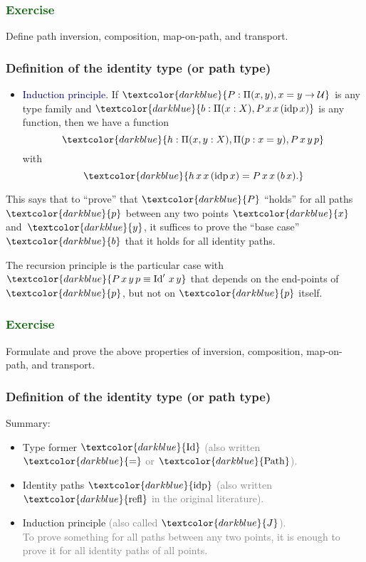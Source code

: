 \documentclass[aspectratio=169]{beamer}
\newcommand{\eqq}{\equiv}
\newcommand{\U}{\operatorname{\mathcal{U}}}
\newcommand{\db}{\textcolor{darkblue}}
\newcommand{\dg}{\textcolor{darkgreen}}
\newcommand{\grey}{\textcolor{grey}}
\newcommand{\m}[1]{$\db{#1}$}
\newcommand{\M}[1]{\[\db{#1}\]}
\newcommand{\refl}{\operatorname{refl}}
\newcommand{\idp}{\operatorname{idp}}
\newcommand{\Id}{\operatorname{Id}}
\newcommand{\Path}{\operatorname{Path}}
\begin{document}
\begin{frame} \frametitle{\dg{Exercise}}

  Define path inversion, composition, map-on-path, and transport.

\end{frame}

 
 \begin{frame}
  \frametitle{Definition of the identity type (or path type)}

  \begin{itemize}
  \item \db{Induction principle}. If \m{P : \Pi(x,y), x=y \to \U} is any type family and \m{b : \Pi(x:X), P\,x\,x\,(\idp x)} is any function, then we have a function
    \M{h : \Pi(x,y:X), \Pi(p:x=y), P\,x\,y\, p}
    with
    \M{h \, x \, x\, (\idp x) = P \, x \, x\, (b\, x).}
  \end{itemize}

  \vfill
  
  This says that to ``prove'' that \m{P} ``holds'' for all paths \m{p}
  between any two points \m{x} and~\m{y}, it suffices to prove the
  ``base case'' \m{b} that it holds for all identity paths.

  \vfill

  The recursion principle is the particular case with \m{P \, x\,y\,p
    \eqq \Id' \,x \,y} that depends on the end-points of \m{p}, but not
  on \m{p} itself.

 \end{frame}

\begin{frame} \frametitle{\dg{Exercise}}

  Formulate and prove the above properties of inversion, composition, map-on-path, and transport.

\end{frame}

 
 \begin{frame}
  \frametitle{Definition of the identity type (or path type)}

  Summary:
  \begin{itemize}
  \vfill \item Type former \m{\Id} \grey{(also written \m{=} or \m{\Path}).}
  \vfill \item Identity paths \m{\idp} \grey{(also written \m{\refl} in the original literature).}
  \vfill \item Induction principle \grey{(also called \m{J}).} \\[1ex] \grey{To prove something for all paths between any two points, it is enough to prove it for all identity paths of all points.}
  \end{itemize}

 \end{frame}
\end{document}
